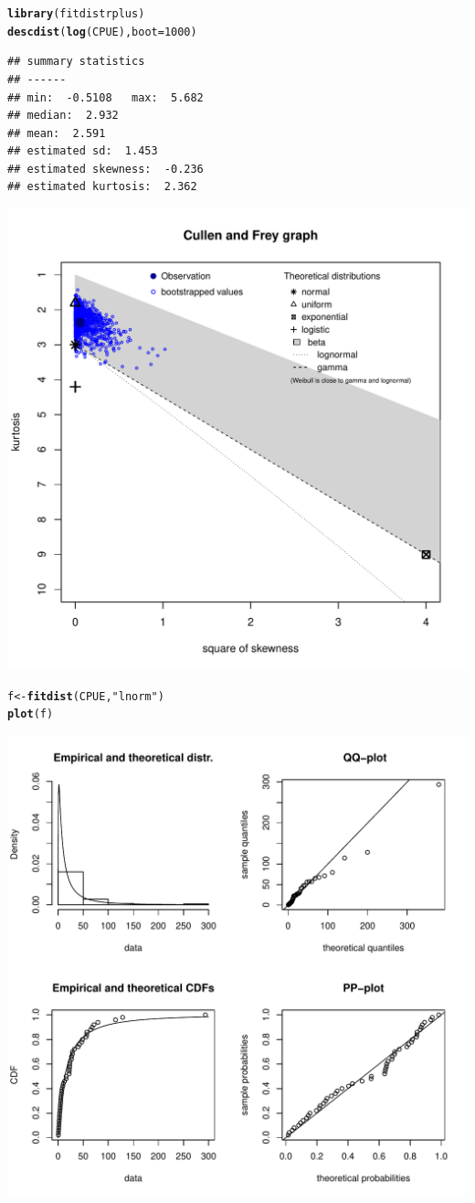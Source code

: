\documentclass{article}\usepackage{graphicx, color}
\makeatletter
\newcommand{\hlfunctioncall}[1]{\textcolor[rgb]{0.501960784313725,0,0.329411764705882}{\textbf{#1}}}%
\newcommand{\hlstring}[1]{\textcolor[rgb]{0.6,0.6,1}{#1}}%
\newenvironment{kframe}{%
 \def\at@end@of@kframe{}%
 \ifinner\ifhmode%
  \def\at@end@of@kframe{\end{minipage}}%
  \begin{minipage}{\columnwidth}%
 \fi\fi%
 \def\FrameCommand##1{\hskip\@totalleftmargin \hskip-\fboxsep
 \colorbox{shadecolor}{##1}\hskip-\fboxsep
     \hskip-\linewidth \hskip-\@totalleftmargin \hskip\columnwidth}%
 \MakeFramed {\advance\hsize-\width
   \@totalleftmargin\z@ \linewidth\hsize
   \@setminipage}}%
 {\par\unskip\endMakeFramed%
 \at@end@of@kframe}
\newenvironment{knitrout}{}{} %
\makeatother
\begin{document}
\begin{enumerate}
\begin{shaded}
\begin{knitrout}
{}

\begin{kframe}\begin{alltt}
\hlfunctioncall{library}(fitdistrplus)
\hlfunctioncall{descdist}(\hlfunctioncall{log}(CPUE), boot = 1000)
\end{alltt}
\begin{verbatim}
## summary statistics
## ------
## min:  -0.5108   max:  5.682 
## median:  2.932 
## mean:  2.591 
## estimated sd:  1.453 
## estimated skewness:  -0.236 
## estimated kurtosis:  2.362
\end{verbatim}
\end{kframe}

{\centering \includegraphics[width=.6\textwidth]{figure/unnamed-chunk-112} 

}

\begin{kframe}\begin{alltt}
f <- \hlfunctioncall{fitdist}(CPUE, \hlstring{"lnorm"})
\hlfunctioncall{plot}(f)
\end{alltt}
\end{kframe}

{\centering \includegraphics[width=.6\textwidth]{figure/unnamed-chunk-113} 

}
\end{knitrout}
\end{shaded}
\end{enumerate}
\end{document}
